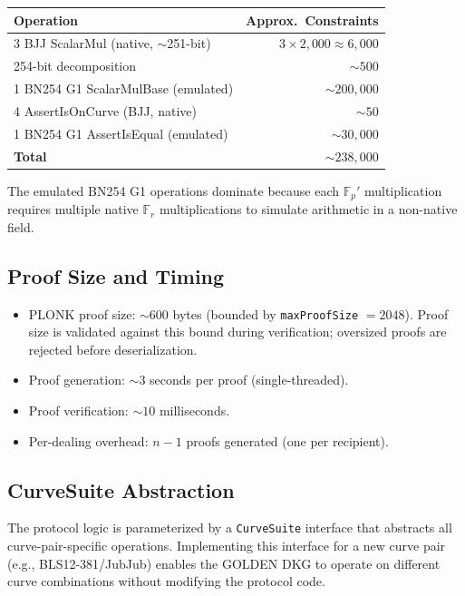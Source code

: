 \documentclass[11pt,a4paper]{article}
\newcommand{\F}{\mathbb{F}}
\newcommand{\Fr}{\F_r}
\newcommand{\Fp}{\F_p}
\begin{document}
\begin{center}
\renewcommand{\arraystretch}{1.3}
\begin{tabular}{@{}lr@{}}
\toprule
\textbf{Operation} & \textbf{Approx.\ Constraints} \\
\midrule
3 BJJ ScalarMul (native, $\sim$251-bit) & $3 \times 2{,}000 \approx 6{,}000$ \\
254-bit decomposition & $\sim 500$ \\
1 BN254 G1 ScalarMulBase (emulated) & $\sim 200{,}000$ \\
4 AssertIsOnCurve (BJJ, native) & $\sim 50$ \\
1 BN254 G1 AssertIsEqual (emulated) & $\sim 30{,}000$ \\
\midrule
\textbf{Total} & $\sim 238{,}000$ \\
\bottomrule
\end{tabular}
\end{center}

The emulated BN254 G1 operations dominate because each $\Fp'$ multiplication
requires multiple native $\Fr$ multiplications to simulate arithmetic in a
non-native field.

\subsection{Proof Size and Timing}

\begin{itemize}[nosep]
  \item PLONK proof size: $\sim 600$ bytes (bounded by \texttt{maxProofSize} $= 2048$).
    Proof size is validated against this bound during verification; oversized
    proofs are rejected before deserialization.
  \item Proof generation: $\sim 3$ seconds per proof (single-threaded).
  \item Proof verification: $\sim 10$ milliseconds.
  \item Per-dealing overhead: $n - 1$ proofs generated (one per recipient).
\end{itemize}

\subsection{CurveSuite Abstraction}
\label{sec:curvesuite}

The protocol logic is parameterized by a \texttt{CurveSuite} interface that
abstracts all curve-pair-specific operations. Implementing this interface for
a new curve pair (e.g., BLS12-381/JubJub) enables the GOLDEN DKG to operate
on different curve combinations without modifying the protocol code.
\end{document}
